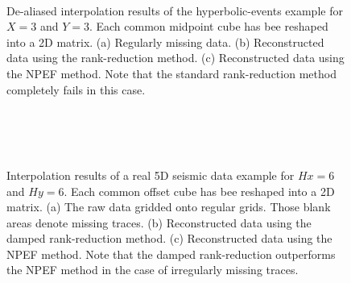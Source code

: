 {\begin{figure}[htb!]
   \centering
   \\
   \\
   \\
\caption{}
\label{fig:la_obs5dfk,la_drr5dfk,la_npef5dfk}
\end{figure}

\begin{figure}[htb!]
   \centering
   \\
   \\
   \\
\caption{De-aliased interpolation results of the hyperbolic-events example for $X=3$ and $Y=3$. Each common midpoint cube has bee reshaped into a 2D matrix. (a) Regularly missing data. (b) Reconstructed data using the rank-reduction method. (c) Reconstructed data using the NPEF method. Note that the standard rank-reduction method completely fails in this case.}
\label{fig:ha_obs5d,ha_drr5d,ha_npef5d}
\end{figure}


\begin{figure}[htb!]
   \centering
   \\
   \\
   \\
\caption{Interpolation results of a real 5D seismic data example for $Hx=6$ and $Hy=6$. Each common offset cube has bee reshaped into a 2D matrix. (a) The raw data gridded onto regular grids. Those blank areas denote missing traces. (b) Reconstructed data using the damped rank-reduction method. (c) Reconstructed data using the NPEF method. Note that the damped rank-reduction outperforms the NPEF method in the case of irregularly missing traces.}
\label{fig:r_obs5d,r_drr5d,r_npef5d}
\end{figure}

}
